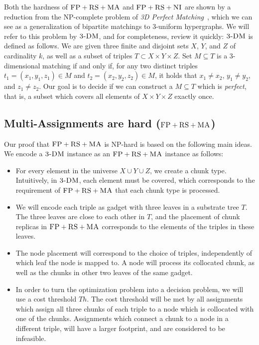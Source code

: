 \documentclass[conference,10pt]{IEEEtran}
\newcommand{\CC}{\textsc{NI}}
\newcommand{\FP}{\textsc{FP}}
\newcommand{\RS}{\textsc{RS}}
\newcommand{\MA}{\textsc{MA}}
\newcommand{\Tree}{\ensuremath{T}}
\newcommand{\TDM}{\textsc{3-DM}}
\newcommand{\Thr}{\ensuremath{Th}}
\begin{document}
Both the hardness of $\FP+\RS+\MA$ and $\FP+\RS+\CC$ are shown by a reduction
from the NP-complete problem of \emph{3D Perfect Matching}~\cite{3dmatch},
which we can see as a generalization of bipartite matchings to 3-uniform
hypergraphs. We will refer to this problem by $\TDM$, and for completeness,
review it quickly:
$\TDM$ is defined as follows. We are given three finite and disjoint
sets $X$, $Y$, and $Z$ of cardinality $k$, as well as a subset of triples $T\subset
X \times Y \times Z$.  Set $M \subseteq T$ is a 3-dimensional matching
if and only if, for any two distinct triples $t_1=(x_1, y_1, z_1) \in M$
and $t_2=(x_2, y_2, z_2) \in M$, it holds that $x_1\neq x_2$, $y_1\neq
y_2$, and $z_1\neq z_2$. Our goal is to decide if we can construct
a $M \subseteq T$ which is \emph{perfect}, that is, a subset which covers all
elements of $X \times Y \times Z$ exactly once.


\subsection{Multi-Assignments are hard ($\FP+\RS+\MA$)}\label{ssec:fprsma}

Our proof that $\FP+\RS+\MA$ is NP-hard is based on the following main ideas.
We encode a $\TDM$ instance as an $\FP+\RS+\MA$ instance as follows:

 \begin{itemize}
 \item For every element in the universe $X\cup Y\cup
 Z$, we create a chunk type. Intuitively, in $\TDM$,
 each element must be covered, which corresponds to the requirement
 of $\FP+\RS+\MA$
 that each chunk type is processed.

 \item We will encode each triple as gadget with three leaves in
 a substrate tree $\Tree$. The three leaves are close to each
 other in $\Tree$, and the placement of chunk replicas in $\FP+\RS+\MA$
 corresponds to the elements of the
 triples in these leaves.

 \item The node placement will correspond to the choice of triples,
 independently of which
leaf the node is mapped to.
 A node will process its collocated chunk,
 as well as the chunks in other two leaves of the same gadget.

\item In order to turn the optimization problem into a decision problem, we will use
a cost threshold $\Thr$. The cost threshold will be met by all
assignments which assign all three chunks of each triple to a
node which is collocated with one of the chunks. Assignments which connect a
chunk to a node in a different triple, will have a larger footprint, and are
considered to be infeasible.

\end{itemize}
\end{document}
